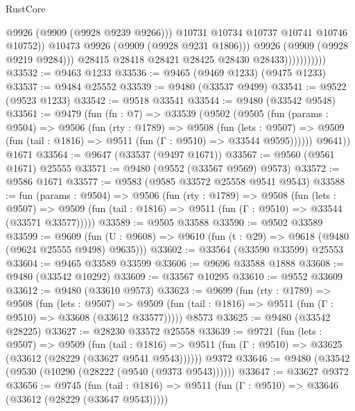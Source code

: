 \begin{lexlean}{RustCore}
\begin{coremodule}
                                    @9926
                                    (@9909 (@9928 @9239 @9266)))
                                  @10731
                                  @10734
                                  @10737
                                  @10741
                                  @10746
                                  @10752))
                              @10473
                              @9926
                              (@9909 (@9928 @9231 @1806)))
                            @9926
                            (@9909 (@9928 @9219 @9284)))
                          @28415
                          @28418
                          @28421
                          @28425
                          @28430
                          @28433)))))))))))
@33532 := @9463 @1233
@33536 := @9465 (@9469 @1233) (@9475 @1233)
@33537 := @9484 @25552
@33539 := @9480 (@33537 @9499)
@33541 := @9522 (@9523 @1233)
@33542 := @9518 @33541
@33544 := @9480 (@33542 @9548)
@33561 := @9479
    (fun (fn : @7) =>
    @33539
      (@9502
        (@9505
          (fun (params : @9504) =>
          @9506
            (fun (rty : @1789) =>
            @9508
              (fun (lets : @9507) =>
              @9509 (fun (tail : @1816) => @9511 (fun (Γ : @9510) => @33544 @9595))))))
        @9641))
    @1671
@33564 := @9647 (@33537 (@9497 @1671))
@33567 := @9560 (@9561 @1671) @25555
@33571 := @9480 (@9552 (@33567 @9569) @9573)
@33572 := @9586 @1671
@33577 := @9583 (@9585 @33572 @25558 @9541 @9543)
@33588 := fun (params : @9504) =>
  @9506
    (fun (rty : @1789) =>
    @9508
      (fun (lets : @9507) =>
      @9509 (fun (tail : @1816) => @9511 (fun (Γ : @9510) => @33544 (@33571 @33577)))))
@33589 := @9505 @33588
@33590 := @9502 @33589
@33599 := @9609
    (fun (U : @9608) => @9610 (fun (t : @29) => @9618 (@9480 (@9624 @25555 @9498) @9635)))
@33602 := @33564 (@33590 @33599) @25553
@33604 := @9465 @33589 @33599
@33606 := @9696 @33588 @1888
@33608 := @9480 (@33542 @10292)
@33609 := @33567 @10295
@33610 := @9552 @33609
@33612 := @9480 (@33610 @9573)
@33623 := @9699
    (fun (rty : @1789) =>
    @9508
      (fun (lets : @9507) =>
      @9509 (fun (tail : @1816) => @9511 (fun (Γ : @9510) => @33608 (@33612 @33577)))))
    @8573
@33625 := @9480 (@33542 @28225)
@33627 := @28230 @33572 @25558
@33639 := @9721
    (fun (lets : @9507) =>
    @9509
      (fun (tail : @1816) =>
      @9511 (fun (Γ : @9510) => @33625 (@33612 (@28229 (@33627 @9541 @9543))))))
    @9372
@33646 := @9480 (@33542 (@9530 (@10290 (@28222 (@9540 (@9373 @9543))))))
@33647 := @33627 @9372
@33656 := @9745
    (fun (tail : @1816) => @9511 (fun (Γ : @9510) => @33646 (@33612 (@28229 (@33647 @9543)))))

\end{coremodule}
\end{lexlean}
